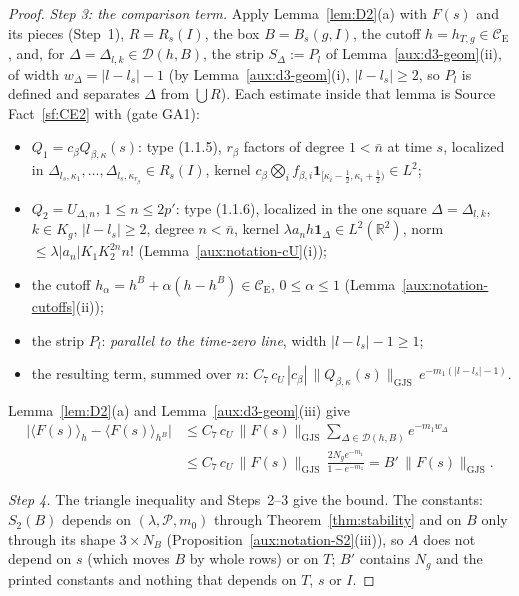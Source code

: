 \documentclass[11pt,a4paper]{article}
\theoremstyle{plain}
\theoremstyle{definition}
\theoremstyle{plain}
\theoremstyle{definition}
\newcommand{\R}{\mathbb{R}}
\newcommand{\CE}{\mathcal{C}_{\mathrm E}}
\newcommand{\GJS}[1]{\lVert #1\rVert_{\mathrm{GJS}}}   %
\newcommand{\ev}[2]{\langle #1\rangle_{#2}}            %
\begin{document}
\begin{proof}
\emph{Step 3: the comparison term.}  Apply Lemma~\ref{lem:D2}(a) with $F(s)$ and its pieces
(Step~1), $R=R_s(I)$, the box $B=B_s(g,I)$, the cutoff $h=h_{T,g}\in\CE$, and, for
$\Delta=\Delta_{l,k}\in\mathcal D(h,B)$, the strip $S_\Delta:=P_l$ of
Lemma~\ref{aux:d3-geom}(ii), of width $w_\Delta=|l-l_s|-1$ (by Lemma~\ref{aux:d3-geom}(i),
$|l-l_s|\ge2$, so $P_l$ is defined and separates $\Delta$ from $\bigcup R$).  Each estimate inside
that lemma is Source Fact~\ref{sf:CE2} with (gate GA1):
\begin{itemize}
\item $Q_1=c_\beta Q_{\beta,\kappa}(s)$: type (1.1.5), $r_\beta$ factors of degree $1<\bar n$ at
  time $s$, localized in $\Delta_{l_s,\kappa_1},\dots,\Delta_{l_s,\kappa_{r_\beta}}\in R_s(I)$,
  kernel $c_\beta\bigotimes_if_{\beta,i}\mathbf 1_{[\kappa_i-\frac12,\kappa_i+\frac12)}\in L^2$;
\item $Q_2=U_{\Delta,n}$, $1\le n\le2p'$: type (1.1.6), localized in the one square
  $\Delta=\Delta_{l,k}$, $k\in K_g$, $|l-l_s|\ge2$, degree $n<\bar n$, kernel
  $\lambda a_nh\mathbf 1_\Delta\in L^2(\R^2)$, norm $\le\lambda|a_n|K_1K_2^{2n}n!$
  (Lemma~\ref{aux:notation-cU}(i));
\item the cutoff $h_\alpha=h^B+\alpha(h-h^B)\in\CE$, $0\le\alpha\le1$
  (Lemma~\ref{aux:notation-cutoffs}(ii));
\item the strip $P_l$: \emph{parallel to the time-zero line}, width $|l-l_s|-1\ge1$;
\item the resulting term, summed over $n$: $C_7\,c_U\,|c_\beta|\,\GJS{Q_{\beta,\kappa}(s)}\,
  e^{-m_1(|l-l_s|-1)}$.
\end{itemize}
Lemma~\ref{lem:D2}(a) and Lemma~\ref{aux:d3-geom}(iii) give
\begin{align*}
 \bigl|\ev{F(s)}{h}-\ev{F(s)}{h^B}\bigr|
 &\le C_7\,c_U\,\GJS{F(s)}\sum_{\Delta\in\mathcal D(h,B)}e^{-m_1w_\Delta}\\
 &\le C_7\,c_U\,\GJS{F(s)}\,\frac{2N_ge^{-m_1}}{1-e^{-m_1}}=B'\,\GJS{F(s)} .
\end{align*}

\emph{Step 4.}  The triangle inequality and Steps~2--3 give the bound.  The constants: $S_2(B)$
depends on $(\lambda,\mathscr P,m_0)$ through Theorem~\ref{thm:stability} and on $B$ only through its shape
$3\times N_B$ (Proposition~\ref{aux:notation-S2}(iii)), so $A$ does not depend on $s$ (which moves
$B$ by whole rows) or on $T$; $B'$ contains $N_g$ and the printed constants and nothing that
depends on $T$, $s$ or $I$.
\end{proof}
\end{document}
